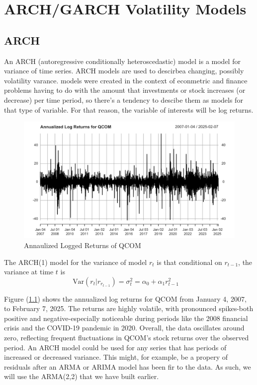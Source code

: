%

\chapter{ARCH/GARCH Volatility Models}

\section{ARCH}

An ARCH (autoregressive conditionally heteroscedastic) model is a model for variance of time series. ARCH models are used to descirbea changing, possibly volatility varance. models were created in the context of econmetric and finance problems having to do with the amount that investments or stock increases (or decrease) per time period, so there's a tendency to descibe them as models for that type of variable. For that reason, the variable of interests will be log returns. 

\begin{figure}[!h]
	\centering
	\includegraphics[width=0.8\linewidth]{content/plots/qcom_log_returns.png}
	\caption{Annaulized Logged Returns of QCOM}
	\label{fig:qcom_returns}
\end{figure}

The ARCH(1) model for the variance of model $r_t$ is that conditional on $r_{t-1}$, the variance at time $t$ is 
\begin{equation}
	\text{Var}\left(r_t|r_{r_{t-1}}\right)=\sigma_t^2=\alpha_0+\alpha_1r_{t-1}^2\quad 
\end{equation}

Figure (\ref{fig:qcom_returns}) shows the annualized log returns for QCOM  from January 4, 2007, to February 7, 2025. The returns are highly volatile, with pronounced spikes-both positive and negative-especially noticeable during periods like the 2008 financial crisis and the COVID-19 pandemic in 2020. Overall, the data oscillates around zero, reflecting frequent fluctuations in QCOM’s stock returns over the observed period. An ARCH model could be used for any series that has periods of increased or decreased variance. This might, for example, be a propery of residuals after an ARMA or ARIMA model has been fir to the data. As such, we will use the ARMA(2,2) that we have built earlier.

